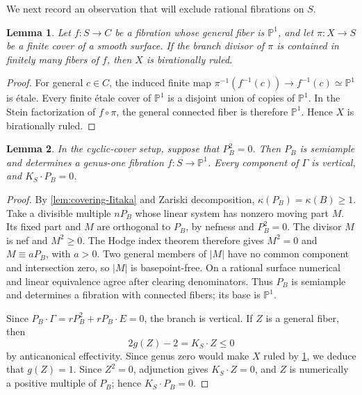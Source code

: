\documentclass[11pt,reqno]{amsart}
\numberwithin{equation}{section}
\newtheorem{lemma}[lemma]{Lemma}
\theoremstyle{remark}
\newcommand{\prj}[1]{\mathbb{P}^{#1}}
\begin{document}
We next record an observation that will exclude rational fibrations on $S$.
\begin{lemma}\label{lem:vertical-branch}
Let \(f\colon S\to C\) be a fibration whose general fiber is
\(\prj{1}\), and let \(\pi\colon X\to S\) be a finite cover of
a smooth surface. If the branch divisor of \(\pi\) is contained in
finitely many fibers of \(f\), then \(X\) is birationally ruled.
\end{lemma}

\begin{proof}
For general \(c\in C\), the induced finite map
\(\pi^{-1}(f^{-1}(c))\to f^{-1}(c)\simeq\prj{1}\) is étale. Every finite
étale cover of \(\prj{1}\) is a disjoint union of copies of \(\prj{1}\).
In the Stein factorization of \(f\circ\pi\), the general connected
fiber is therefore \(\prj{1}\). Hence \(X\) is birationally ruled.
\end{proof}

\begin{lemma}\label{lem:isotropic-fibration}
In the cyclic-cover setup, suppose that \(P_B^2=0\).
Then \(P_B\) is semiample and determines a genus-one fibration \(f\colon S\to\prj{1}\). Every component of \(\Gamma\) is vertical, and \(K_S\cdot P_B=0\).
\end{lemma}

\begin{proof}
By \cref{lem:covering-Iitaka} and Zariski decomposition,
\(\kappa(P_B)=\kappa(B)\geq1\).
Take a divisible multiple \(nP_B\) whose linear system has nonzero
moving part \(M\). Its fixed part and \(M\) are orthogonal to
\(P_B\), by nefness and \(P_B^2=0\). The divisor \(M\) is nef and
\(M^2\geq0\). The Hodge index theorem therefore gives
\(M^2=0\) and \(M\equiv aP_B\), with \(a>0\).
Two general members of \(|M|\) have no common component and
intersection zero, so \(|M|\) is basepoint-free. On a rational
surface numerical and linear equivalence agree after clearing
denominators. Thus \(P_B\) is semiample and determines a fibration
with connected fibers; its base is \(\prj{1}\).

Since \(P_B\cdot\Gamma=rP_B^2+rP_B\cdot E=0\), the branch is
vertical. If \(Z\) is a general fiber, then
\[
 2g(Z)-2=K_S\cdot Z\leq0
\]
by anticanonical effectivity. Since genus zero would make \(X\) ruled by \cref{lem:vertical-branch}, we deduce that \(g(Z)=1\). Since \(Z^2=0\), adjunction gives \(K_S\cdot Z=0\), and \(Z\) is numerically a positive multiple of \(P_B\); hence \(K_S\cdot P_B=0\).
\end{proof}
\end{document}
